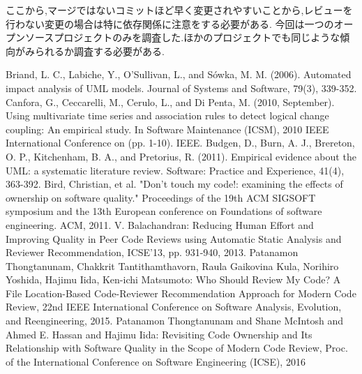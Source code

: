 \documentclass{fose2016}           %
\begin{document}
ここから,マージではないコミットほど早く変更されやすいことから,レビューを行わない変更の場合は特に依存関係に注意をする必要がある.
今回は一つのオープンソースプロジェクトのみを調査した.ほかのプロジェクトでも同じような傾向がみられるか調査する必要がある.



\begin{thebibliography}{10}
Briand, L. C., Labiche, Y., O’Sullivan, L., and Sówka, M. M. (2006). Automated impact analysis of UML models. Journal of Systems and Software, 79(3), 339-352.
 Canfora, G., Ceccarelli, M., Cerulo, L., and Di Penta, M. (2010, September). Using multivariate time series and association rules to detect logical change coupling: An empirical study. In Software Maintenance (ICSM), 2010 IEEE International Conference on (pp. 1-10). IEEE.
Budgen, D., Burn, A. J., Brereton, O. P., Kitchenham, B. A., and Pretorius, R. (2011). Empirical evidence about the UML: a systematic literature review. Software: Practice and Experience, 41(4), 363-392.
Bird, Christian, et al. "Don't touch my code!: examining the effects of ownership on software quality." Proceedings of the 19th ACM SIGSOFT symposium and the 13th European conference on Foundations of software engineering. ACM, 2011.
V. Balachandran: Reducing Human Effort and Improving Quality in Peer Code Reviews using Automatic Static Analysis and Reviewer Recommendation, ICSE'13, pp. 931-940, 2013.
Patanamon Thongtanunam, Chakkrit Tantithamthavorn, Raula Gaikovina Kula, Norihiro Yoshida, Hajimu Iida, Ken-ichi Matsumoto: Who Should Review My Code? A File Location-Based Code-Reviewer Recommendation Approach for Modern Code Review, 22nd IEEE International Conference on Software Analysis, Evolution, and Reengineering, 2015.
Patanamon Thongtanunam and Shane McIntosh and Ahmed E. Hassan and Hajimu Iida: Revisiting Code Ownership and Its Relationship with Software Quality in the Scope of Modern Code Review, Proc. of the International Conference on Software Engineering (ICSE), 2016
 \end{thebibliography}
\end{document}
